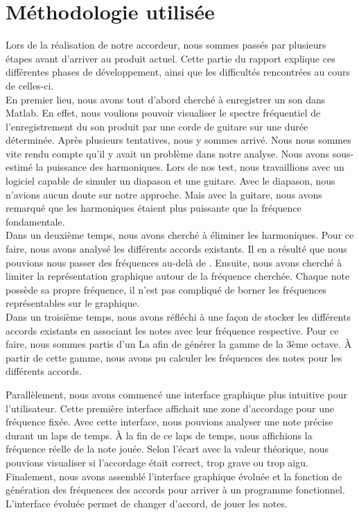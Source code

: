 \section{Méthodologie utilisée}
Lors de la réalisation de notre accordeur, nous sommes passés par plusieurs étapes avant d'arriver au produit actuel. Cette partie du rapport explique ces différentes phases de développement, ainsi que les difficultés rencontrées au cours de celles-ci.\\

En premier lieu, nous avons tout d'abord cherché à enregistrer un son dans Matlab. En effet, nous voulions pouvoir visualiser le spectre fréquentiel de l'enregistrement du son produit par une corde de guitare sur une durée déterminée.
Après plusieurs tentatives, nous y sommes arrivé.
Nous nous sommes vite rendu compte qu'il y avait un problème dans notre analyse.
Nous avons sous-estimé la puissance des harmoniques.
Lors de nos test, nous travaillions avec un logiciel capable de simuler un diapason et une guitare.
Avec le diapason, nous n'avions aucun doute sur notre approche.
Mais avec la guitare, nous avons remarqué que les harmoniques étaient plus puissante que la fréquence fondamentale.\\

Dans un deuxième temps, nous avons cherché à éliminer les harmoniques.
Pour ce faire, nous avons analysé les différents accords existants.
Il en a résulté que nous pouvions nous passer des fréquences au-delà de .
Ensuite, nous avons cherché à limiter la représentation graphique autour de la fréquence cherchée.
Chaque note possède sa propre fréquence, il n'est pas compliqué de borner les fréquences représentables sur le graphique.\\

Dans un troisième temps, nous avons réfléchi à une façon de stocker les différents accords existants en associant les notes avec leur fréquence respective.
Pour ce faire, nous sommes partis d'un La  afin de générer la gamme de la 3ème octave. À partir de cette gamme, nous avons pu calculer les fréquences des notes pour les différents accords.

Parallèlement, nous avons commencé une interface graphique plus intuitive pour l'utilisateur.
Cette première interface affichait une zone d'accordage pour une fréquence fixée.
Avec cette interface, nous pouvions analyser une note précise durant un laps de temps. À la fin de ce laps de temps, nous affichions la fréquence réelle de la note jouée. Selon l'écart avec la valeur théorique, nous pouvions visualiser si l'accordage était correct, trop grave ou trop aigu.\\

Finalement, nous avons assemblé l'interface graphique évoluée et la fonction de génération des fréquences des accords pour arriver à un programme fonctionnel.
L'interface évoluée permet de changer d'accord, de jouer les notes.


